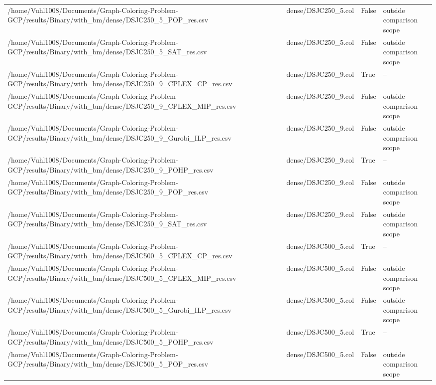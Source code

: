 \begin{table}[htbp]
\begin{tabular}{llll}
/home/Vuhl1008/Documents/Graph-Coloring-Problem-GCP/results/Binary/with\_bm/dense/DSJC250\_5\_POP\_res.csv & dense/DSJC250\_5.col & False & outside comparison scope \\
/home/Vuhl1008/Documents/Graph-Coloring-Problem-GCP/results/Binary/with\_bm/dense/DSJC250\_5\_SAT\_res.csv & dense/DSJC250\_5.col & False & outside comparison scope \\
/home/Vuhl1008/Documents/Graph-Coloring-Problem-GCP/results/Binary/with\_bm/dense/DSJC250\_9\_CPLEX\_CP\_res.csv & dense/DSJC250\_9.col & True & -- \\
/home/Vuhl1008/Documents/Graph-Coloring-Problem-GCP/results/Binary/with\_bm/dense/DSJC250\_9\_CPLEX\_MIP\_res.csv & dense/DSJC250\_9.col & False & outside comparison scope \\
/home/Vuhl1008/Documents/Graph-Coloring-Problem-GCP/results/Binary/with\_bm/dense/DSJC250\_9\_Gurobi\_ILP\_res.csv & dense/DSJC250\_9.col & False & outside comparison scope \\
/home/Vuhl1008/Documents/Graph-Coloring-Problem-GCP/results/Binary/with\_bm/dense/DSJC250\_9\_POHP\_res.csv & dense/DSJC250\_9.col & True & -- \\
/home/Vuhl1008/Documents/Graph-Coloring-Problem-GCP/results/Binary/with\_bm/dense/DSJC250\_9\_POP\_res.csv & dense/DSJC250\_9.col & False & outside comparison scope \\
/home/Vuhl1008/Documents/Graph-Coloring-Problem-GCP/results/Binary/with\_bm/dense/DSJC250\_9\_SAT\_res.csv & dense/DSJC250\_9.col & False & outside comparison scope \\
/home/Vuhl1008/Documents/Graph-Coloring-Problem-GCP/results/Binary/with\_bm/dense/DSJC500\_5\_CPLEX\_CP\_res.csv & dense/DSJC500\_5.col & True & -- \\
/home/Vuhl1008/Documents/Graph-Coloring-Problem-GCP/results/Binary/with\_bm/dense/DSJC500\_5\_CPLEX\_MIP\_res.csv & dense/DSJC500\_5.col & False & outside comparison scope \\
/home/Vuhl1008/Documents/Graph-Coloring-Problem-GCP/results/Binary/with\_bm/dense/DSJC500\_5\_Gurobi\_ILP\_res.csv & dense/DSJC500\_5.col & False & outside comparison scope \\
/home/Vuhl1008/Documents/Graph-Coloring-Problem-GCP/results/Binary/with\_bm/dense/DSJC500\_5\_POHP\_res.csv & dense/DSJC500\_5.col & True & -- \\
/home/Vuhl1008/Documents/Graph-Coloring-Problem-GCP/results/Binary/with\_bm/dense/DSJC500\_5\_POP\_res.csv & dense/DSJC500\_5.col & False & outside comparison scope \\

\end{tabular}
\end{table}
